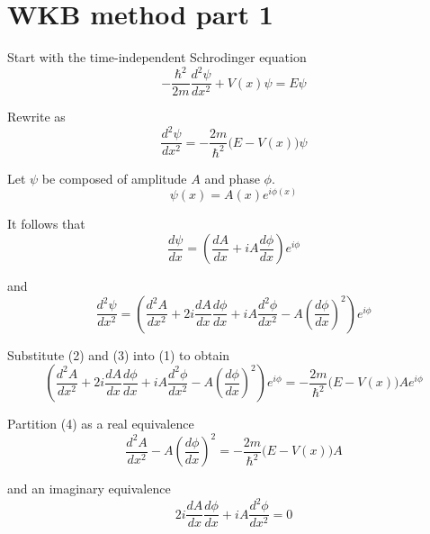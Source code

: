 


\section*{WKB method part 1}

Start with the time-independent Schrodinger equation
\begin{equation*}
-\frac{\hbar^2}{2m}\frac{d^2\psi}{dx^2}+V(x)\psi=E\psi
\end{equation*}

Rewrite as
\begin{equation*}
\frac{d^2\psi}{dx^2}=-\frac{2m}{\hbar^2}\bigl(E-V(x)\bigr)\psi
\tag{1}
\end{equation*}

Let $\psi$ be composed of amplitude $A$ and phase $\phi$.
\begin{equation*}
\psi(x)=A(x)e^{i\phi(x)}
\tag{2}
\end{equation*}

It follows that
\begin{equation*}
\frac{d\psi}{dx}=\left(\frac{dA}{dx}+iA\frac{d\phi}{dx}\right)e^{i\phi}
\end{equation*}

and
\begin{equation*}
\frac{d^2\psi}{dx^2}=\left(
\frac{d^2A}{dx^2}+2i\frac{dA}{dx}\frac{d\phi}{dx}
+iA\frac{d^2\phi}{dx^2}-A\left(\frac{d\phi}{dx}\right)^2
\right)e^{i\phi}
\tag{3}
\end{equation*}

Substitute (2) and (3) into (1) to obtain
\begin{equation*}
\left(
\frac{d^2A}{dx^2}+2i\frac{dA}{dx}\frac{d\phi}{dx}
+iA\frac{d^2\phi}{dx^2}-A\left(\frac{d\phi}{dx}\right)^2
\right)e^{i\phi}
=-\frac{2m}{\hbar^2}\bigl(E-V(x)\bigr)Ae^{i\phi}
\tag{4}
\end{equation*}

Partition (4) as a real equivalence
\begin{equation*}
\frac{d^2A}{dx^2}-A\left(\frac{d\phi}{dx}\right)^2
=-\frac{2m}{\hbar^2}\bigl(E-V(x)\bigr)A
\tag{5}
\end{equation*}

and an imaginary equivalence
\begin{equation*}
2i\frac{dA}{dx}\frac{d\phi}{dx}+iA\frac{d^2\phi}{dx^2}=0
\tag{6}
\end{equation*}

